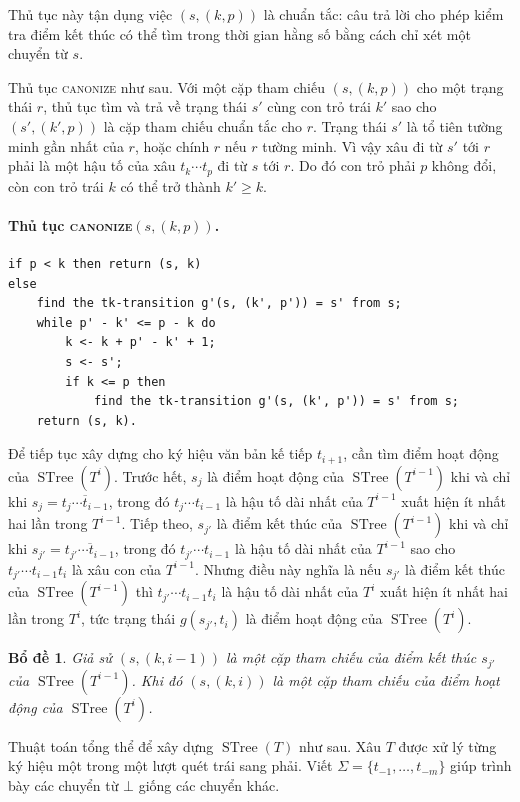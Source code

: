 \documentclass[11pt]{article}
\newtheorem{lemma}{Bổ đề}
\newcommand{\STree}{\operatorname{STree}}
\begin{document}
Thủ tục này tận dụng việc $(s,(k,p))$ là chuẩn tắc: câu trả lời cho phép kiểm
tra điểm kết thúc có thể tìm trong thời gian hằng số bằng cách chỉ xét một
chuyển từ $s$.

Thủ tục \textsc{canonize} như sau. Với một cặp tham chiếu $(s,(k,p))$ cho một
trạng thái $r$, thủ tục tìm và trả về trạng thái $s'$ cùng con trỏ trái $k'$
sao cho $(s',(k',p))$ là cặp tham chiếu chuẩn tắc cho $r$. Trạng thái $s'$ là
tổ tiên tường minh gần nhất của $r$, hoặc chính $r$ nếu $r$ tường minh. Vì
vậy xâu đi từ $s'$ tới $r$ phải là một hậu tố của xâu $t_k\cdots t_p$ đi từ
$s$ tới $r$. Do đó con trỏ phải $p$ không đổi, còn con trỏ trái $k$ có thể
trở thành $k'\ge k$.

\paragraph{Thủ tục \textsc{canonize}$(s,(k,p))$.}
\begin{verbatim}
if p < k then return (s, k)
else
    find the tk-transition g'(s, (k', p')) = s' from s;
    while p' - k' <= p - k do
        k <- k + p' - k' + 1;
        s <- s';
        if k <= p then
            find the tk-transition g'(s, (k', p')) = s' from s;
    return (s, k).
\end{verbatim}

Để tiếp tục xây dựng cho ký hiệu văn bản kế tiếp $t_{i+1}$, cần tìm điểm hoạt
động của $\STree(T^i)$. Trước hết, $s_j$ là điểm hoạt động của
$\STree(T^{i-1})$ khi và chỉ khi $s_j=\overline{t_j\cdots t_{i-1}}$, trong đó
$t_j\cdots t_{i-1}$ là hậu tố dài nhất của $T^{i-1}$ xuất hiện ít nhất hai
lần trong $T^{i-1}$. Tiếp theo, $s_{j'}$ là điểm kết thúc của
$\STree(T^{i-1})$ khi và chỉ khi $s_{j'}=\overline{t_{j'}\cdots t_{i-1}}$,
trong đó $t_{j'}\cdots t_{i-1}$ là hậu tố dài nhất của $T^{i-1}$ sao cho
$t_{j'}\cdots t_{i-1}t_i$ là xâu con của $T^{i-1}$. Nhưng điều này nghĩa là
nếu $s_{j'}$ là điểm kết thúc của $\STree(T^{i-1})$ thì
$t_{j'}\cdots t_{i-1}t_i$ là hậu tố dài nhất của $T^i$ xuất hiện ít nhất hai
lần trong $T^i$, tức trạng thái $g(s_{j'},t_i)$ là điểm hoạt động của
$\STree(T^i)$.

\begin{lemma}
Giả sử $(s,(k,i-1))$ là một cặp tham chiếu của điểm kết thúc $s_{j'}$ của
$\STree(T^{i-1})$. Khi đó $(s,(k,i))$ là một cặp tham chiếu của điểm hoạt động
của $\STree(T^i)$.
\end{lemma}

Thuật toán tổng thể để xây dựng $\STree(T)$ như sau. Xâu $T$ được xử lý từng
ký hiệu một trong một lượt quét trái sang phải. Viết
$\Sigma=\{t_{-1},\ldots,t_{-m}\}$ giúp trình bày các chuyển từ $\bot$ giống
các chuyển khác.
\end{document}

